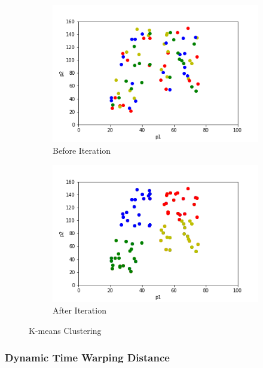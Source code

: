 \documentclass[11pt]{article} %
\theoremstyle{plain}
\theoremstyle{definition}
\newcommand*{\figuretitle}[1]{
  {
    \centering
    \text{#1}
    \par\medskip
  }
}
\begin{document}
\begin{figure}[ht]
  \centering
  \figuretitle{K = 4}
  \begin{subfigure}[b]{0.48\textwidth}
    \includegraphics[width=\linewidth, center]{resources/kmeans_before.png}
    \caption{Before Iteration}
    \label{fig:before_iter}
  \end{subfigure}
  \begin{subfigure}[b]{0.48\textwidth}
    \includegraphics[width=\linewidth, center]{resources/kmeans_after.png}
    \caption{After Iteration}
    \label{fig:after_iter}
  \end{subfigure}
  \caption{K-means Clustering}
  \label{fig:kmeans}
\end{figure}

\subsubsection{Dynamic Time Warping Distance}
\end{document}
